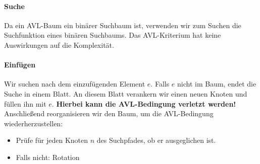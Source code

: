 \documentclass[11pt,a4paper]{scrartcl}
\begin{document}
\paragraph{Suche}
Da ein AVL-Baum ein binärer Suchbaum ist, verwenden wir zum Suchen die Suchfunktion eines binären Suchbaums. Das AVL-Kriterium hat keine Auswirkungen auf die Komplexität.
\paragraph{Einfügen}
Wir suchen nach dem einzufügenden Element $e$. Falls $e$ nicht im Baum, endet die Suche in einem Blatt. An diesem Blatt verankern wir einen neuen Knoten und füllen ihn mit $e$. \textbf{Hierbei kann die AVL-Bedingung verletzt werden!} \\
Anschließend reorganisieren wir den Baum, um die AVL-Bedingung wiederherzustellen:
\begin{itemize}
\item Prüfe für jeden Knoten $n$ des Suchpfades, ob er ausgeglichen ist.
\item Falls nicht: Rotation
\end{itemize}
\end{document}
